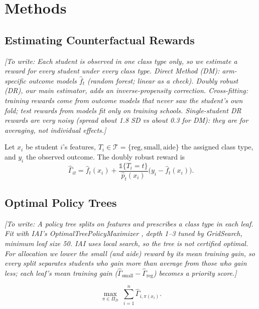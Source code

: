 \documentclass[11pt]{article}
\newcommand{\placeholder}[1]{\par\noindent\textit{[To write: #1]}\par}
\newcommand{\treatmentset}{\mathcal{T}}
\begin{document}
\section{Methods}  %

\subsection{Estimating Counterfactual Rewards}
\placeholder{Each student is observed in one class type only, so we estimate a reward
for every student under every class type. Direct Method (DM): arm-specific outcome models
$\widehat f_t$ (random forest; linear as a check). Doubly robust (DR), our main
estimator, adds an inverse-propensity correction. Cross-fitting: training rewards come
from outcome models that never saw the student's own fold; test rewards from models fit
only on training schools. Single-student DR rewards are very noisy (spread about 1.8 SD
vs about 0.3 for DM): they are for averaging, not individual effects.}

Let $x_i$ be student $i$'s features, $T_i\in\treatmentset=\{\mathrm{reg},\mathrm{small},
\mathrm{aide}\}$ the assigned class type, and $y_i$ the observed outcome. The doubly
robust reward is
\begin{equation}
\widehat{\Gamma}_{it}
=\widehat{f}_{t}(x_i)
+\frac{\mathbb{1}\{T_i=t\}}{\widehat{p}_{t}(x_i)}
\bigl(y_i-\widehat{f}_{t}(x_i)\bigr).
\label{eq:dr}
\end{equation}

\subsection{Optimal Policy Trees}
\placeholder{A policy tree splits on features and prescribes a class type in each leaf.
Fit with IAI's OptimalTreePolicyMaximizer \cite{amram2022,iai}, depth 1--3 tuned by
GridSearch, minimum leaf size 50. IAI uses local search, so the tree is not certified
optimal. For allocation we lower the small (and aide) reward by its mean training gain, so
every split separates students who gain more than average from those who gain less; each
leaf's mean training gain ($\widehat\Gamma_{\mathrm{small}}-\widehat\Gamma_{\mathrm{reg}}$)
becomes a priority score.}

\begin{equation}
\max_{\pi\in\Pi_D}\; \sum_{i=1}^{n}\widehat{\Gamma}_{i,\pi(x_i)}.
\label{eq:opt}
\end{equation}
\end{document}
